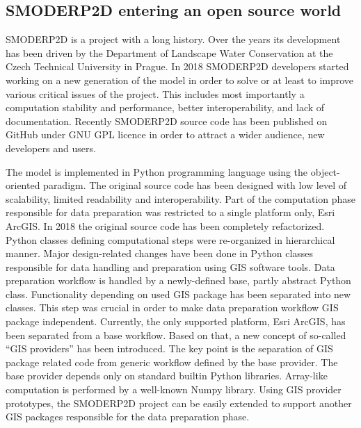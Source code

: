 \subsection{SMODERP2D entering an open source world}

SMODERP2D is a project with a long history. Over the years its
development has been driven by the Department of Landscape Water
Conservation at the Czech Technical University in Prague. In 2018
SMODERP2D developers started working on a new generation of the model
in order to solve or at least to improve various critical issues of
the project. This includes most importantly a computation stability
and performance, better interoperability, and lack of
documentation. Recently SMODERP2D source code has been published on
GitHub \cite{smoderp2d-github-2019} under GNU GPL licence in order to
attract a wider audience, new developers and users.

The model is implemented in Python programming language using the
object-oriented paradigm. The original source code has been designed
with low level of scalability, limited readability and
interoperability. Part of the computation phase responsible for data
preparation was restricted to a single platform only, Esri ArcGIS. In
2018 the original source code has been completely refactorized. Python
classes defining computational steps were re-organized in hierarchical
manner. Major design-related changes have been done in Python classes
responsible for data handling and preparation using GIS software
tools. Data preparation workflow is handled by a newly-defined base,
partly abstract Python class. Functionality depending on used GIS
package has been separated into new classes. This step was crucial in
order to make data preparation workflow GIS package
independent. Currently, the only supported platform, Esri ArcGIS, has
been separated from a base workflow. Based on that, a new concept of
so-called “GIS providers” has been introduced. The key point is the
separation of GIS package related code from generic workflow defined
by the base provider. The base provider depends only on standard
builtin Python libraries. Array-like computation is performed by a
well-known Numpy library. Using GIS provider prototypes, the SMODERP2D
project can be easily extended to support another GIS packages
responsible for the data preparation phase.

